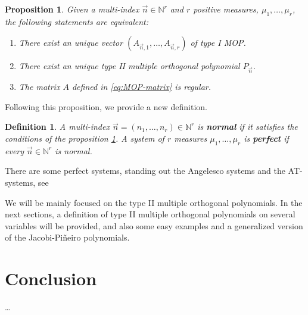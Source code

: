 \documentclass[12pt,a4]{article}
\theoremstyle{plain}
\newtheorem{proposition}[theorem]{Proposition}
\newtheorem{definition}[theorem]{Definition}
\newcommand{\N}[0]{\mathbb{N}}
\begin{document}
\begin{proposition}
    \label{prop:existence-of-MOP}
    Given a multi-index $\vec n\in\N^r$ and $r$ positive measures, $\mu_1,\dots,\mu_r$, the following statements are equivalent:
    \begin{enumerate}
        \item There exist an unique vector $(A_{\vec n,1}, \dots, A_{\vec n,r})$ of type I MOP.
        \item There exist an unique type II multiple orthogonal polynomial $P_{\vec n}$.
        \item The matrix $A$ defined in \eqref{eq:MOP-matrix} is regular.
    \end{enumerate}
\end{proposition}

Following this proposition, we provide a new definition.

\begin{definition}
    A multi-index $\vec n = (n_1,\dots,n_r)\in\N^r$ is \textbf{normal} if it satisfies the conditions of the proposition \ref{prop:existence-of-MOP}.
    A system of $r$ measures $\mu_1,\dots,\mu_r$ is \textbf{perfect} if every $\vec n\in\N^r$ is normal.
\end{definition}

There are some perfect systems, standing out the Angelesco systems and the AT-systems, see \cite[Sections 23.1.1 and 23.1.2]{Ismail}


We will be mainly focused on the type II multiple orthogonal polynomials. In the next sections, a definition of type II multiple orthogonal polynomials on several variables will be provided, and also some easy examples and a generalized version of the Jacobi-Piñeiro polynomials. 

\section{Conclusion}
\dots

\nocite{*}
{}

\end{document}
